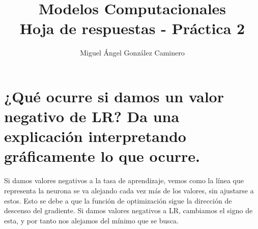 \documentclass{article}
\title{Modelos Computacionales \\ Hoja de respuestas - Práctica 2}
\author{Miguel Ángel González Caminero}
\date\noexpand
\begin{document}
\maketitle
\tableofcontents
\newpage

\section{¿Qué ocurre si damos un valor negativo de LR? Da una explicación interpretando gráficamente lo que ocurre.}

Si damos valores negativos a la tasa de aprendizaje, vemos como la línea que representa la neurona se va alejando cada vez más de los valores,
sin ajustarse a estos. Esto se debe a que la función de optimización sigue la dirección de descenso del gradiente. Si damos valores negativos a LR,
cambiamos el signo de esta, y por tanto nos alejamos del mínimo que se busca.
\end{document}
